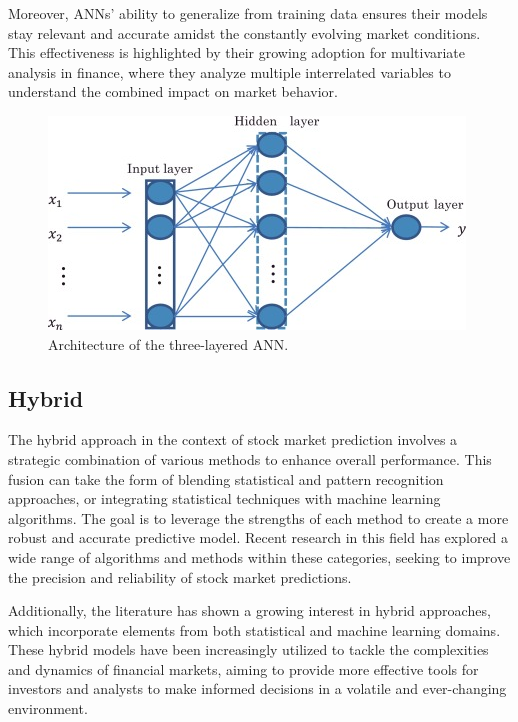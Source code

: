 \documentclass[10pt,twocolumn,letterpaper]{article}
\begin{document}
Moreover, ANNs' ability to generalize from training data ensures their models stay relevant and accurate amidst the constantly evolving market conditions.
This effectiveness is highlighted by their growing adoption for multivariate analysis in finance, where they analyze multiple interrelated variables to understand the combined impact on market behavior.
\begin{figure}[h]
	\centering
	\includegraphics[width=\columnwidth]{ann}
	\caption{Architecture of the three-layered ANN.}
	\label{fig:ann}
\end{figure}
\subsection{Hybrid}
The hybrid approach in the context of stock market prediction involves a strategic combination of various methods to enhance overall performance.
This fusion can take the form of blending statistical and pattern recognition approaches, or integrating statistical techniques with machine learning algorithms.
The goal is to leverage the strengths of each method to create a more robust and accurate predictive model.
Recent research in this field has explored a wide range of algorithms and methods within these categories, seeking to improve the precision and reliability of stock market predictions.

Additionally, the literature has shown a growing interest in hybrid approaches, which incorporate elements from both statistical and machine learning domains.
These hybrid models have been increasingly utilized to tackle the complexities and dynamics of financial markets, aiming to provide more effective tools for investors and analysts to make informed decisions in a volatile and ever-changing environment.
\end{document}
